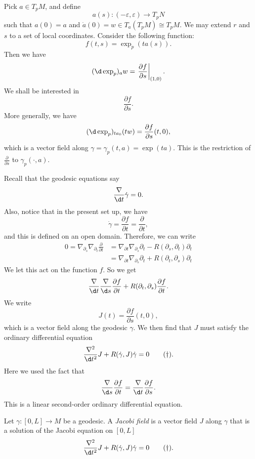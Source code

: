 \documentclass[a4paper]{article}
\begin{document}
Pick $a \in T_p M$, and define
\[
  a(s): (-\varepsilon, \varepsilon) \to T_p N
\]
such that $a(0) = a$ and $\dot{a}(0) = w \in T_a(T_p M) \cong T_p M$. We may extend $r$ and $s$ to a set of local coordinates. Consider the following function:
\[
  f(t, s) = \exp_p(t a(s)).
\]
Then we have
\[
  (\d \exp_p)_a w = \left.\frac{\partial f}{\partial s}\right|_{(1, 0)}.
\]
We shall be interested in
\[
  \frac{\partial f}{\partial s}.
\]
More generally, we have
\[
  (\d \exp_p)_{t a_0} (tw) = \frac{\partial f}{\partial s}(t, 0),
\]
which is a vector field along $\gamma = \gamma_p(t, a) = \exp(ta)$. This is the restriction of $\frac{\partial}{\partial s}$ to $\gamma_p(\cdot, a)$.

Recall that the geodesic equations say
\[
  \frac{\nabla}{\d t} \dot{\gamma} = 0.
\]
Also, notice that in the present set up, we have
\[
  \dot{\gamma} = \frac{\partial f}{\partial t} = \frac{\partial}{\partial t},
\]
and this is defined on an open domain. Therefore, we can write
\begin{align*}
  0 = \nabla_{\partial_s} \nabla_{\partial_t} \frac{\partial}{\partial t} &= \nabla_{\partial t} \nabla_{\partial_s} \partial_t - R(\partial_s, \partial_t) \partial_t\\
  &= \nabla_{\partial t} \nabla_{\partial_s} \partial_t + R(\partial_t, \partial_s) \partial_t
\end{align*}
We let this act on the function $f$. So we get
\[
  \frac{\nabla}{\d t} \frac{\nabla}{\d s} \frac{\partial f}{\partial t} + R(\partial_t, \partial_s) \frac{\partial f}{\partial t}.
\]
We write
\[
  J(t) = \frac{\partial f}{\partial s}(t, 0),
\]
which is a vector field along the geodesic $\gamma$. We then find that $J$ must satisfy the ordinary differential equation
\[
  \frac{\nabla^2}{\d t^2} J + R(\dot{\gamma}, J) \dot{\gamma} = 0 \tag{$\dagger$}.
\]
Here we used the fact that
\[
  \frac{\nabla}{\d s} \frac{\partial f}{\partial t} = \frac{\nabla}{\d t} \frac{\partial f}{\partial s}.
\]
This is a linear second-order ordinary differential equation.

\begin{defi}
  Let $\gamma: [0, L] \to M$ be a geodesic. A \emph{Jacobi field} is a vector field $J$ along $\gamma$ that is a solution of the Jacobi equation on $[0, L]$
  \[
    \frac{\nabla^2}{\d t^2} J + R(\dot{\gamma}, J) \dot{\gamma} = 0 \tag{$\dagger$}.
  \]
\end{defi}
\end{document}
